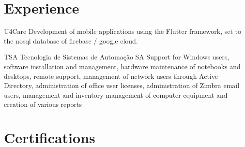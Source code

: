\documentclass[letterpaper]{moderncurriculum} %
\begin{document}
\section{Experience}
\begin{biglist} %
    \space    
	{U4Care}%
	{}%
	{Development of mobile applications using the Flutter framework, set to the nosql database of firebase / google cloud.}
\end{biglist}
\begin{biglist} %
    \space    
	{TSA Tecnologia de Sistemas de Automação SA}%
	{}%
	{Support for Windows users, software installation and management, hardware maintenance of notebooks and desktops, remote support, management of network users through Active Directory, administration of office user licenses, administration of Zimbra email users, management and inventory management of computer equipment and creation of various reports}
\end{biglist}
\section{Certifications}
\begin{shortlist} %

 \end{shortlist}






\end{document}

